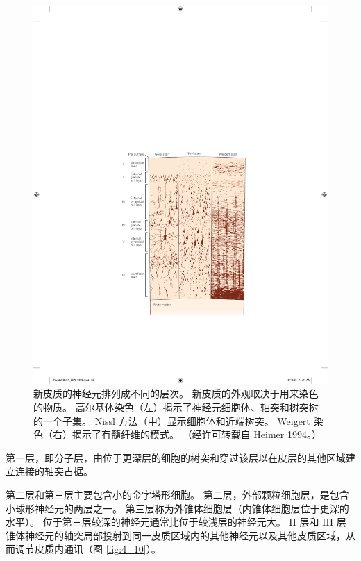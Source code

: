 \begin{figure}[htbp]
	\centering
	\includegraphics[width=1.0\linewidth]{chap04/fig_4_9}
	\caption{新皮质的神经元排列成不同的层次。 
		新皮质的外观取决于用来染色的物质。 
		高尔基体染色（左）揭示了神经元细胞体、轴突和树突树的一个子集。 
		Nissl 方法（中）显示细胞体和近端树突。 
		Weigert 染色（右）揭示了有髓纤维的模式。 （经许可转载自 Heimer 1994。）}
	\label{fig:4_9}
\end{figure}


第一层，即分子层，由位于更深层的细胞的树突和穿过该层以在皮层的其他区域建立连接的轴突占据。


第二层和第三层主要包含小的金字塔形细胞。 
第二层，外部颗粒细胞层，是包含小球形神经元的两层之一。 
第三层称为外锥体细胞层（内锥体细胞层位于更深的水平）。 
位于第三层较深的神经元通常比位于较浅层的神经元大。 
II 层和 III 层锥体神经元的轴突局部投射到同一皮质区域内的其他神经元以及其他皮质区域，从而调节皮质内通讯（图 \ref{fig:4_10}）。

